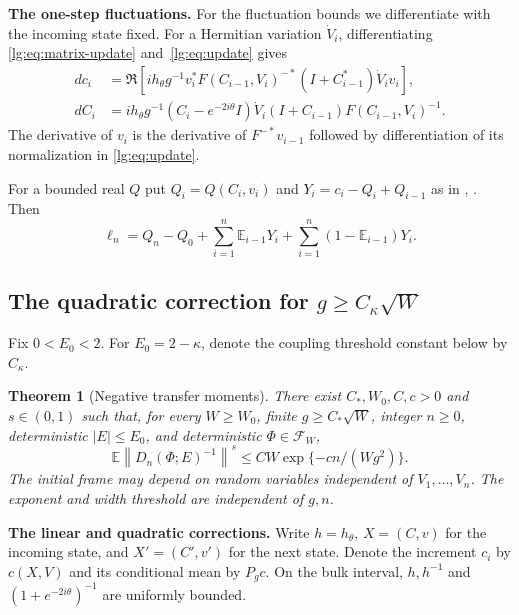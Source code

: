 \documentclass[11pt]{article}
\numberwithin{equation}{section}
\newtheorem{theorem}{Theorem}[section]
\theoremstyle{remark}
\newcommand{\E}{\mathbb E}
\newcommand{\norm}[1]{\left\|#1\right\|}
\begin{document}
\medskip\noindent\textbf{The one-step fluctuations.}
For the fluctuation bounds we differentiate with the incoming state fixed.
For a Hermitian variation $\dot V_i$, differentiating
\eqref{lg:eq:matrix-update} and~\eqref{lg:eq:update} gives
\begin{equation}\label{lg:eq:gradients}
 \begin{aligned}
 dc_i&=\Re[ih_\theta g^{-1}v_i^*F(C_{i-1},V_i)^{-*}
             (I+C_{i-1}^*)\dot V_i v_i],\\
 dC_i&=ih_\theta g^{-1}(C_i-e^{-2i\theta}I)\dot V_i
             (I+C_{i-1})F(C_{i-1},V_i)^{-1}.
 \end{aligned}
\end{equation}
The derivative of $v_i$ is the derivative of $F^{-*}v_{i-1}$ followed
by differentiation of its normalization in \eqref{lg:eq:update}.

For a bounded real $Q$ put $Q_i=Q(C_i,v_i)$ and $Y_i=c_i-Q_i+Q_{i-1}$
as in \cite[Lemma~1]{SBanomaly}, \cite[Section~3]{SSB}. Then
\[
 \ell_n=Q_n-Q_0+\sum_{i=1}^n\E_{i-1}Y_i+
                    \sum_{i=1}^n(1-\E_{i-1})Y_i .
\]

\subsection{The quadratic correction for \texorpdfstring{$g\ge C_\kappa\sqrt W$}{g at least C kappa times sqrt W}}
\label{sec:uniform-large-g}

Fix $0<E_0<2$. For $E_0=2-\kappa$, denote the coupling threshold
constant below by $C_\kappa$.

\begin{theorem}[Negative transfer moments]\label{uvg:thm:transfer}
There exist \(C_*,W_0,C,c>0\) and \(s\in(0,1)\) such that, for
every \(W\ge W_0\), finite \(g\ge C_*\sqrt W\), integer \(n\ge0\),
deterministic \(|E|\le E_0\), and deterministic
\(\Phi\in\mathcal F_W\),
\[
 \E\norm{D_n(\Phi;E)^{-1}}^s
 \le CW\exp\{-cn/(Wg^2)\}.
\]
The initial frame may depend on random variables independent of
\(V_1,\ldots,V_n\). The exponent and width threshold are independent
of \(g,n\).
\end{theorem}

\medskip\noindent\textbf{The linear and quadratic corrections.}
Write $h=h_\theta$, $X=(C,v)$ for the incoming state, and $X'=(C',v')$
for the next state. Denote the increment $c_i$ by $c(X,V)$ and its
conditional mean by $P_gc$. On the bulk interval,
$h,h^{-1}$ and $(1+e^{-2i\theta})^{-1}$ are uniformly bounded.
\end{document}
